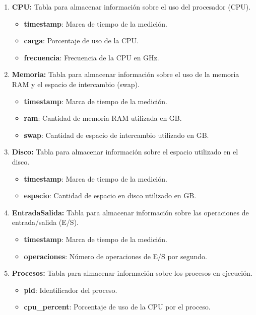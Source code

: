 \documentclass{article}
\begin{document}
\begin{enumerate}
    \item \textbf{CPU:} Tabla para almacenar información sobre el uso del procesador (CPU).
    \begin{itemize}
        \item \textbf{timestamp}: Marca de tiempo de la medición.
        \item \textbf{carga}: Porcentaje de uso de la CPU.
        \item \textbf{frecuencia}: Frecuencia de la CPU en GHz.
    \end{itemize}
    \item \textbf{Memoria:} Tabla para almacenar información sobre el uso de la memoria RAM y el espacio de intercambio (swap).
    \begin{itemize}
        \item \textbf{timestamp}: Marca de tiempo de la medición.
        \item \textbf{ram}: Cantidad de memoria RAM utilizada en GB.
        \item \textbf{swap}: Cantidad de espacio de intercambio utilizado en GB.
    \end{itemize}
    \item \textbf{Disco:} Tabla para almacenar información sobre el espacio utilizado en el disco.
    \begin{itemize}
        \item \textbf{timestamp}: Marca de tiempo de la medición.
        \item \textbf{espacio}: Cantidad de espacio en disco utilizado en GB.
    \end{itemize}
    \item \textbf{EntradaSalida:} Tabla para almacenar información sobre las operaciones de entrada/salida (E/S).
    \begin{itemize}
        \item \textbf{timestamp}: Marca de tiempo de la medición.
        \item \textbf{operaciones}: Número de operaciones de E/S por segundo.
    \end{itemize}
    \item \textbf{Procesos:} Tabla para almacenar información sobre los procesos en ejecución.
    \begin{itemize}
        \item \textbf{pid}: Identificador del proceso.
        \item \textbf{cpu\_percent}: Porcentaje de uso de la CPU por el proceso.

\end{itemize}
\end{enumerate}
\end{document}
